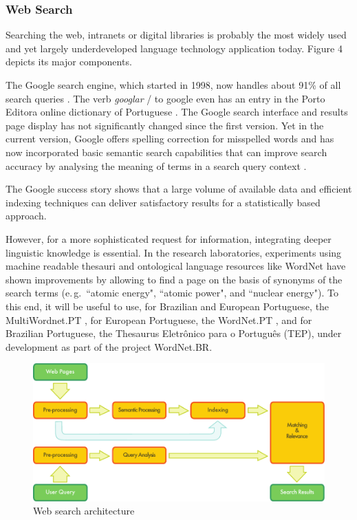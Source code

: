 \begin{multicols}{2}
\subsubsection{Web Search}


Searching the web, intranets or digital libraries is probably the most widely used and yet largely underdeveloped language technology application today. Figure 4 depicts its major components. 

The Google search engine, which started in 1998, now handles about 91\% of all search queries \cite{spi1}. 
The verb \textit{googlar} / to google even has an entry in the Porto E\-di\-to\-ra online dictionary of Portuguese \cite{portoeditoraonline}. 
The Google search interface and results page display has not significantly changed since the first version. 
Yet in the current version, Google offers spelling correction for misspelled words and has now incorporated basic semantic search capabilities that can improve search accuracy by analysing the meaning of terms in a search query context \cite{pc1}. 

The Google success story shows that a large volume of available data and efficient indexing techniques can deliver satisfactory results for a statistically based approach.   

 However, for a more sophisticated request for information, integrating deeper linguistic knowledge is essential. In the research laboratories, experiments using machine
readable thesauri and ontological language resources like WordNet have shown improvements by allowing to find a page on the basis of synonyms of the search terms (e.\,g.~“atomic energy", “atomic power", and “nuclear energy"). To this end, 
it will be useful to use, for Brazilian and European Portuguese, the MultiWordnet.PT \cite{multiwordnet}, for European Portuguese, the WordNet.PT \cite{wordnetpt},
and for Brazilian Portuguese, the Thesaurus Eletrônico para o Português (TEP),  under development as part of the project WordNet.BR.


\begin{figure}[htb]
  \center
  \includegraphics[width=\textwidth]{../_media/english/web_search_architecture}
  \caption{Web search architecture}
  \label{fig:websearcharch_en}
 \end{figure}



\end{multicols}
